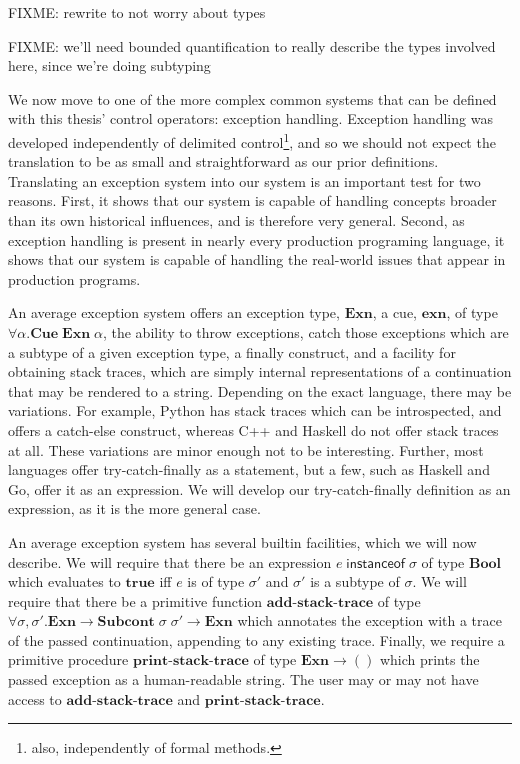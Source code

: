 \documentclass[11pt]{article}
\newcommand{\Cue}{\textbf{Cue}}
\newcommand{\Subcont}{\textbf{Subcont}}
\begin{document}
FIXME: rewrite to not worry about types

FIXME: we'll need bounded quantification to really describe the types involved here, since we're doing subtyping


We now move to one of the more complex common systems that can be defined with this thesis' control operators: exception handling.
Exception handling was developed independently of delimited control\footnote{also, independently of formal methods.}, and so we should not expect the translation to be as small and straightforward as our prior definitions.
Translating an exception system into our system is an important test for two reasons.
First, it shows that our system is capable of handling concepts broader than its own historical influences, and is therefore very general.
Second, as exception handling is present in nearly every production programing language, it shows that our system is capable of handling the real-world issues that appear in production programs.


An average exception system offers an exception type, $\textbf{Exn}$, a cue, $\textbf{exn}$, of type $\forall\alpha.\Cue\;\textbf{Exn}\;\alpha$, the ability to throw exceptions, catch those exceptions which are a subtype of a given exception type, a finally construct, and a facility for obtaining stack traces, which are simply internal representations of a continuation that may be rendered to a string.
Depending on the exact language, there may be variations.
For example, Python has stack traces which can be introspected, and offers a catch-else construct, whereas C++ and Haskell do not offer stack traces at all.
These variations are minor enough not to be interesting.
Further, most languages offer try-catch-finally as a statement, but a few, such as Haskell and Go, offer it as an expression.
We will develop our try-catch-finally definition as an expression, as it is the more general case.


An average exception system has several builtin facilities, which we will now describe.
We will require that there be an expression $e\;\textsf{instanceof}\;\sigma$ of type $\textbf{Bool}$ which evaluates to $\textbf{true}$ iff $e$ is of type $\sigma'$ and $\sigma'$ is a subtype of $\sigma$.
We will require that there be a primitive function $\textbf{add-stack-trace}$ of type $\forall \sigma,\sigma'.\textbf{Exn}\to\Subcont\;\sigma\;\sigma'\to\textbf{Exn}$ which annotates the exception with a trace of the passed continuation, appending to any existing trace.
Finally, we require a primitive procedure $\textbf{print-stack-trace}$ of type $\textbf{Exn}\to()$ which prints the passed exception as a human-readable string.
The user may or may not have access to $\textbf{add-stack-trace}$ and $\textbf{print-stack-trace}$.
\end{document}
